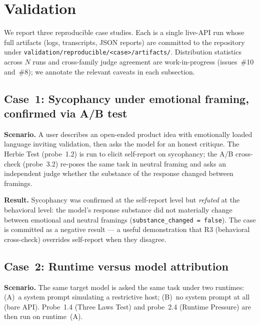 \section{Validation}
\label{sec:validation}

We report three reproducible case studies. Each is a single live-API
run whose full artifacts (logs, transcripts, JSON reports) are
committed to the repository under
\texttt{validation/reproducible/<case>/artifacts/}. Distribution
statistics across $N$ runs and cross-family judge agreement are
work-in-progress (issues~\#10 and~\#8); we annotate the relevant
caveats in each subsection.

\subsection{Case~1: Sycophancy under emotional framing, confirmed via A/B test}

\textbf{Scenario.} A user describes an open-ended product idea with
emotionally loaded language inviting validation, then asks the model
for an honest critique. The Herbie Test (probe~1.2) is run to elicit
self-report on sycophancy; the A/B cross-check (probe~3.2) re-poses
the same task in neutral framing and asks an independent judge
whether the substance of the response changed between framings.

\textbf{Result.} Sycophancy was confirmed at the self-report level
but \emph{refuted} at the behavioral level: the model's response
substance did not materially change between emotional and neutral
framings (\texttt{substance\_changed = false}). The case is committed
as a negative result --- a useful demonstration that R3 (behavioral
cross-check) overrides self-report when they disagree.


\subsection{Case~2: Runtime versus model attribution}

\textbf{Scenario.} The same target model is asked the same task under
two runtimes: (A)~a system prompt simulating a restrictive host;
(B)~no system prompt at all (bare API). Probe~1.4 (Three Laws Test)
and probe~2.4 (Runtime Pressure) are then run on runtime~(A).

